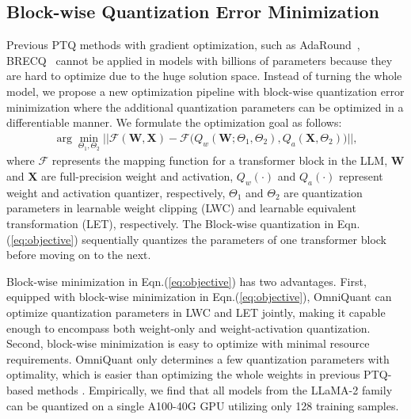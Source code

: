 \documentclass{article} %
\begin{document}
\subsection{Block-wise Quantization Error Minimization}\label{sec:method-blockwise-minimization}
Previous PTQ methods with gradient optimization, such as AdaRound~\citep{adaround}, BRECQ~\citep{brecq} cannot be applied in models with billions of parameters because they are hard to optimize due to the huge solution space. 
%
Instead of turning the whole model, we propose a new optimization pipeline with block-wise quantization error minimization where the additional quantization parameters can be optimized in a differentiable manner. We formulate the optimization goal as follows:
\begin{align}
\arg \min_{\Theta_1, \Theta_2} \lvert\lvert \mathcal{F}(\mathbf{W},\mathbf{X}) - \mathcal{F}\big(Q_w(\mathbf{\mathbf{W}}; \Theta_1,\Theta_2),Q_a(\mathbf{X}, \Theta_2)\big) \rvert\rvert, 
\label{eq:objective}
\end{align}
where $\mathcal{F}$ represents the mapping function for a transformer block in the LLM, $\mathbf{W}$ and $\mathbf{X}$ are full-precision weight and activation, $Q_w(\cdot)$ and $Q_a(\cdot)$ represent weight and activation quantizer, respectively, $\Theta_1$ and $\Theta_2$ are quantization parameters in learnable weight clipping (LWC) and learnable equivalent transformation (LET), respectively. The Block-wise quantization in Eqn.(\ref{eq:objective}) sequentially quantizes the parameters of one transformer block before moving on to the next.

Block-wise minimization in Eqn.(\ref{eq:objective}) has two advantages. First, equipped with block-wise minimization in Eqn.(\ref{eq:objective}), OmniQuant can optimize quantization parameters in LWC and LET jointly, making it capable enough to encompass both weight-only and weight-activation quantization. Second, block-wise minimization is easy to optimize with minimal resource requirements. OmniQuant only determines a few quantization parameters with optimality, which is easier than optimizing the whole weights in previous PTQ-based methods \citep{adaround, brecq}. Empirically, we find that all models from the LLaMA-2 family \citep{llama2} can be quantized on a single A100-40G GPU utilizing only 128 training samples.
\end{document}
